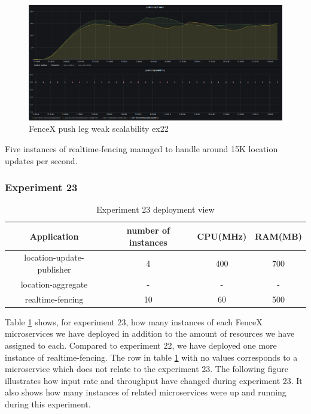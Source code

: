 \documentclass[a4]{report}
\begin{document}
    \begin{figure}[h!]
        \centering
        \caption{FenceX push leg weak scalability ex22}
        \label{fig:ex22}
        \includegraphics[width=\linewidth, scale=2]{images/evaluation/ex22-benchmarking-ongoing-1per2sec.png}
    \end{figure}
    Five instances of realtime-fencing managed to handle around 15K location updates per second.

    \clearpage

    \subsubsection{Experiment 23}
    \begin{table}[h!]
        \centering
        \begin{tabular}{|c|c|c|c|}
            \hline
            Application               & number of instances & CPU(MHz) & RAM(MB) \\
            \hline
            location-update-publisher & 4                   & 400      & 700     \\
            location-aggregate        & -                   & -        & -       \\
            realtime-fencing          & 10                  & 60       & 500     \\
            \hline
        \end{tabular}
        \caption{Experiment 23 deployment view}
        \label{table:ex23-dv}
    \end{table}

    Table \ref{table:ex23-dv} shows, for experiment 23, how many instances of each FenceX microservices we have
    deployed in addition to the amount of resources we have assigned to each.
    Compared to experiment 22, we have deployed one more instance of realtime-fencing.
    The row in table \ref{table:ex23-dv} with no values corresponds to a microservice which does not relate to the
    experiment 23.
    The following figure illustrates how input rate and throughput have changed during experiment 23.
    It also shows how many instances of related microservices were up and running during this experiment.
\end{document}
